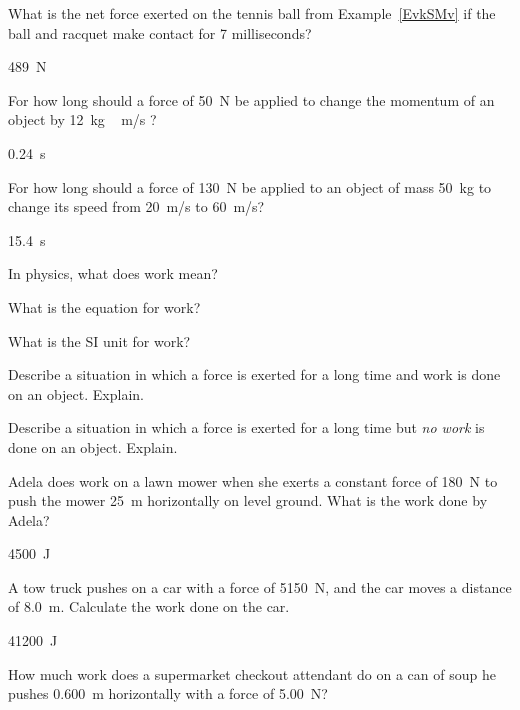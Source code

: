 \documentclass[../main-physics-problems.tex]{subfiles}
\begin{document}
\begin{questions}
\question \label{e2TgS9}
What is the net force exerted on the tennis ball from Example~\ref{EvkSMv} if the ball and racquet make contact for 7 milliseconds?

\begin{solution}
\SI{489}{N}
\end{solution}

\question \label{2lAWwf}
For how long should a force of \SI{50}{N}  be applied to change the momentum of an object by \SI{12}{kg\,m/s} ?

\begin{solution}
\SI{0.24}{s}
\end{solution}

\question \label{6e43y6}
For how long should a force of \SI{130}{N} be applied to an object of mass \SI{50}{kg} to change its speed from \SI{20}{m/s} to \SI{60}{m/s}?

\begin{solution}
\SI{15.4}{s}
\end{solution}


\question \label{S3zmkv}
In physics, what does work mean?


\question
What is the equation for work?


\question
What is the SI unit for work?


\question
Describe a situation in which a force is exerted for a long time and work is done on an object. Explain.


\question \label{g5xjKT}
Describe a situation in which a force is exerted for a long time but \textit{no work} is done on an object. Explain.


\question \label{Xh4gxC}
Adela does work on a lawn mower when she exerts a constant force of \SI{180}{N} to push the mower \SI{25}{m} horizontally on level ground. What is the work done by Adela?

\begin{solution}
\SI{4500}{J}
\end{solution}

\question \label{ZGiBxy}
A tow truck pushes on a car with a force of \SI{5150}{N}, and the car moves a distance of \SI{8.0}{m}. Calculate the work done on the car.

\begin{solution}
\SI{41200}{J}
\end{solution}

\question \label{MTcEJo}
How much work does a supermarket checkout attendant do on a can of soup he pushes \SI{0.600}{m} horizontally with a force of \SI{5.00}{N}?


\end{questions}
\end{document}

